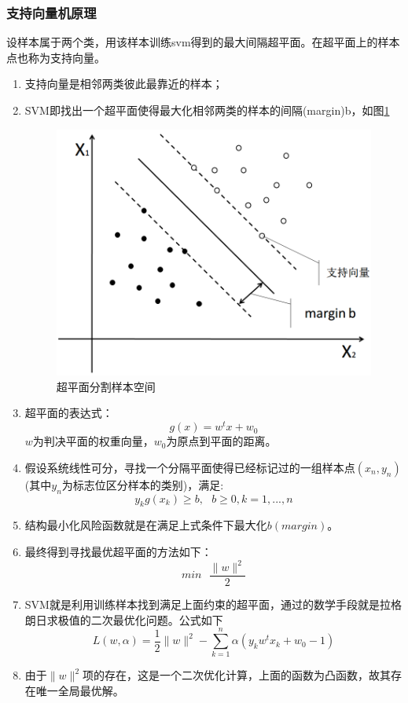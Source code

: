 \documentclass[UTF8, twocolumn ]{ctexart}
\begin{document}
\subsubsection{支持向量机原理}
设样本属于两个类，用该样本训练svm得到的最大间隔超平面。在超平面上的样本点也称为支持向量。
\begin{enumerate}
\item 支持向量是相邻两类彼此最靠近的样本；
\item SVM即找出一个超平面使得最大化相邻两类的样本的间隔(margin)b，如图\ref{fig:no7}
  \begin{figure}[!ht]\centering
    \includegraphics[keepaspectratio, scale=0.35]{no7.png}
    \caption{超平面分割样本空间\label{fig:no7}} 
  \end{figure}
\item 超平面的表达式：
  \begin{equation}
    g(x)=w^{t}x+w_{0}
  \end{equation}
  $w$为判决平面的权重向量，$w_{0}$为原点到平面的距离。
\item 假设系统线性可分，寻找一个分隔平面使得已经标记过的一组样本点$(x_{n},y_{n})$(其中$y_{n}$为标志位区分样本的类别)，满足:
  \begin{equation}
    y_{k}g(x_{k})\geqslant b, \ \ \ b\geqslant0,k=1,...,n
  \end{equation}
\item 结构最小化风险函数就是在满足上式条件下最大化$b(margin)$。
\item 最终得到寻找最优超平面的方法如下：
  \begin{equation}
    min \ \ \ \frac{\|w\|^{2}}{2}
  \end{equation}
\item SVM就是利用训练样本找到满足上面约束的超平面，通过的数学手段就是拉格朗日求极值的二次最优化问题。公式如下
  \begin{equation}
    L(w,\alpha)=\frac{1}{2}\|w\|^{2}-\sum_{k=1}^{n}\alpha(y_{k}w^{t}x_{k}+w_{0}-1)
  \end{equation}
\item 由于$\|w\|^{2}$项的存在，这是一个二次优化计算，上面的函数为凸函数，故其存在唯一全局最优解。
\end{enumerate}
\end{document}
